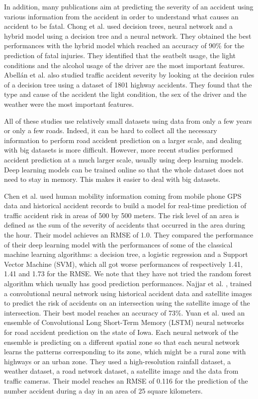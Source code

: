 \documentclass[conference]{IEEEtran}
\begin{document}
  In addition, many publications aim at predicting the severity of an accident using various information from the accident in order to understand what causes an accident to be fatal.
Chong et al.\cite{Chong2005} used decision trees, neural network and a hybrid model using a decision tree and a neural network.
They obtained the best performances with the hybrid model which reached an accuracy of 90\% for the prediction of fatal injuries.
They identified that the seatbelt usage, the light conditions and the alcohol usage of the driver are the most important features.
Abellán et al. \cite{Abellan2013} also studied traffic accident severity by looking at the decision rules of a decision tree using a dataset of 1801 highway accidents.
They found that the type and cause of the accident the light condition, the sex of the driver and the weather were the most important features.

All of these studies use relatively small datasets using data from only a few years or only a few roads.
Indeed, it can be hard to collect all the necessary information to perform road accident prediction on a larger scale, and dealing with big datasets is more difficult.
However, more recent studies performed accident prediction at a much larger scale, usually using deep learning models.
Deep learning models can be trained online so that the whole dataset does not need to stay in memory.
This makes it easier to deal with big datasets.

Chen et al. \cite{QChen2016} used human mobility information coming from mobile phone GPS data and historical accident records to build a model for real-time prediction of traffic accident risk in areas of 500 by 500 meters.
The risk level of an area is defined as the sum of the severity of accidents that occurred in the area during the hour.
Their model achieves an RMSE of 1.0.
They compared the performance of their deep learning model with the performances of some of the classical machine learning algorithms: a decision tree, a logistic regression and a Support Vector Machine (SVM), which all got worse performances of respectively 1.41, 1.41 and 1.73 for the RMSE.
We note that they have not tried the random forest algorithm which usually has good prediction performances.
Najjar et al. \cite{Najjar2017}, trained a convolutional neural network using historical accident data and satellite images to predict the risk of accidents on an intersection using the satellite image of the intersection.
Their best model reaches an accuracy of 73\%.
Yuan et al. \cite{Yuan2018} used an ensemble of Convolutional Long Short-Term Memory (LSTM) neural networks for road accident prediction on the state of Iowa.
Each neural network of the ensemble is predicting on a different spatial zone so that each neural network learns the patterns corresponding to its zone, which might be a rural zone with highways or an urban zone.
They used a high-resolution rainfall dataset, a weather dataset, a road network dataset, a satellite image and the data from traffic cameras.
Their model reaches an RMSE of 0.116 for the prediction of the number accident during a day in an area of 25 square kilometers.
\end{document}
